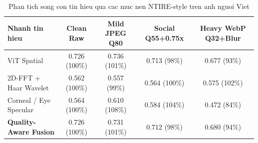 \begin{table}[t]
\centering
\caption{Phan tich song con tin hieu qua cac muc nen NTIRE-style tren anh nguoi Viet}
\begin{tabular}{lcccc}
\toprule
Nhanh tin hieu & Clean Raw & Mild JPEG Q80 & Social Q55+0.75x & Heavy WebP Q32+Blur \\
\midrule
ViT Spatial & 0.726 (100\%) & 0.736 (101\%) & 0.713 (98\%) & 0.677 (93\%) \\
2D-FFT + Haar Wavelet & 0.562 (100\%) & 0.557 (99\%) & 0.564 (100\%) & 0.575 (102\%) \\
Corneal / Eye Specular & 0.564 (100\%) & 0.610 (108\%) & 0.584 (104\%) & 0.472 (84\%) \\
\textbf{Quality-Aware Fusion} & 0.726 (100\%) & 0.731 (101\%) & 0.712 (98\%) & 0.680 (94\%) \\
\bottomrule
\end{tabular}
\end{table}